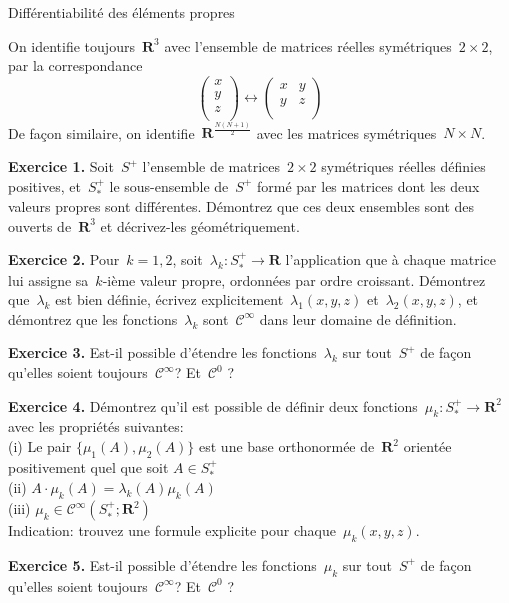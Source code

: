 \documentclass[a4paper,11pt]{article}
\def\R{\mathbf{R}}
\begin{document}
\thispagestyle{empty}

\begin{center}
	\Large Différentiabilité des éléments propres
\end{center}

On identifie toujours~$\R^3$ avec l'ensemble de matrices réelles symétriques~$2\times
2$, par la correspondance
\[
	\begin{pmatrix}
		x\\
		y\\
		z\\
	\end{pmatrix}
	\longleftrightarrow
	\begin{pmatrix}
		x & y \\
		y & z \\
	\end{pmatrix}
\]
De façon similaire, on identifie~$\R^{\frac{N(N+1)}{2}}$
avec les matrices symétriques~$N\times N$.

{\bf Exercice 1.}
Soit~$S^+$ l'ensemble de matrices~$2\times 2$ symétriques réelles définies
positives, et~$S^+_*$ le sous-ensemble de~$S^+$ formé par les matrices dont les
deux valeurs propres sont différentes.  Démontrez que ces deux ensembles sont
des ouverts de~$\R^3$ et décrivez-les géométriquement.

{\bf Exercice 2.}
Pour~$k=1,2$, soit~$\lambda_k:S^+_*\to\R$ l'application que à chaque matrice
lui assigne sa~$k$-ième valeur propre, ordonnées par ordre croissant.
Démontrez que~$\lambda_k$ est bien définie,
écrivez
explicitement~$\lambda_1(x,y,z)$ et~$\lambda_2(x,y,z)$, et démontrez que les
fonctions~$\lambda_k$ sont~$\mathcal{C}^\infty$ dans leur domaine de
définition.

{\bf Exercice 3.} Est-il possible d'étendre les fonctions~$\lambda_k$ sur
tout~$S^+$ de façon qu'elles soient toujours~$\mathcal{C}^\infty$?
Et~$\mathcal{C}^0$ ?

{\bf Exercice 4.}
Démontrez qu'il est possible de définir deux fonctions~$\mu_k:S^+_*\to\R^2$
avec les propriétés suivantes:\\
(i) Le pair
$\{\mu_1(A),\mu_2(A)\}$ est une base orthonormée
de~$\R^2$ orientée positivement quel que soit
$A\in S^+_*$\\
(ii) $A\cdot\mu_k(A)=\lambda_k(A)\mu_k(A)$\\
(iii) $\mu_k\in\mathcal{C}^\infty(S^+_*;\R^2)$\\
Indication: trouvez une formule explicite pour chaque~$\mu_k(x,y,z)$.


{\bf Exercice 5.}
Est-il possible d'étendre les fonctions~$\mu_k$ sur
tout~$S^+$ de façon qu'elles soient toujours~$\mathcal{C}^\infty$?
Et~$\mathcal{C}^0$ ?
\end{document}
